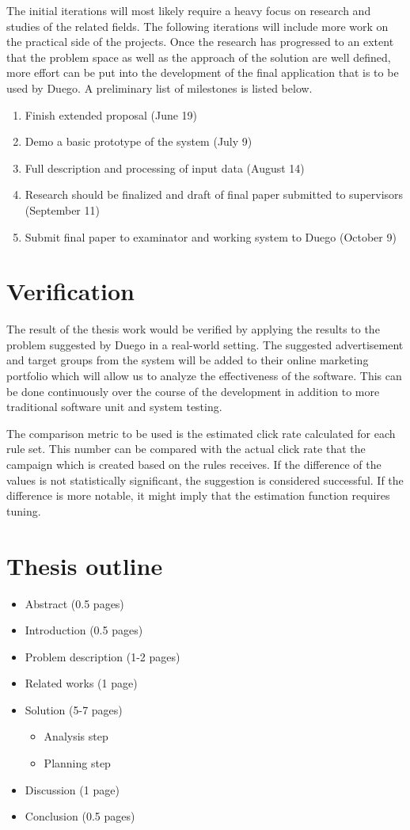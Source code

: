 \documentclass[a4paper]{article}
\begin{document}
The initial iterations will most likely require a heavy focus on research and studies of the related fields. The following
iterations will include more work on the practical side of the projects. Once the research has progressed to an extent that the
problem space as well as the approach of the solution are well defined, more effort can be put into the development of the final
application that is to be used by Duego. A preliminary list of milestones is listed below.

\begin{enumerate}
	\item Finish extended proposal (June 19)
	\item Demo a basic prototype of the system (July 9)
	\item Full description and processing of input data (August 14)
	\item Research should be finalized and draft of final paper submitted to supervisors (September 11)
	\item Submit final paper to examinator and working system to Duego (October 9)
\end{enumerate}

\section{Verification}
The result of the thesis work would be verified by applying the results to the problem suggested by Duego in a real-world setting.
The suggested advertisement and target groups from the system will be added to their online marketing portfolio which will allow
us to analyze the effectiveness of the software. This can be done continuously over the course of the development in addition to
more traditional software unit and system testing.

The comparison metric to be used is the estimated click rate calculated for each rule set. This number can be compared with the
actual click rate that the campaign which is created based on the rules receives. If the difference of the values is not
statistically significant, the suggestion is considered successful. If the difference is more notable, it might imply that the
estimation function requires tuning.

\section{Thesis outline}
\begin{itemize}
	\item Abstract (0.5 pages)
	\item Introduction (0.5 pages)
	\item Problem description (1-2 pages)
	\item Related works (1 page)
	\item Solution (5-7 pages)
	\begin{itemize}
		\item Analysis step
		\item Planning step
	\end{itemize}
	\item Discussion (1 page)
	\item Conclusion (0.5 pages)
\end{itemize}


\end{document}
